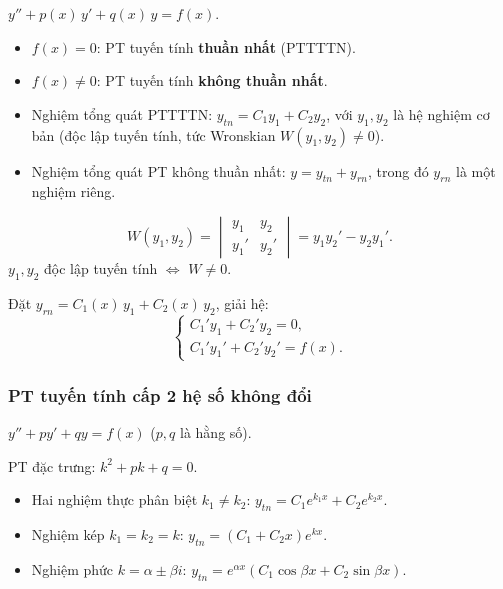 \documentclass[12pt,a4paper]{article}
\begin{document}
\begin{dinhnghia}
  $y'' + p(x)\,y' + q(x)\,y = f(x)$.
  \begin{itemize}
    \item $f(x) = 0$: PT tuyến tính \textbf{thuần nhất} (PTTTTN).
    \item $f(x) \ne 0$: PT tuyến tính \textbf{không thuần nhất}.
  \end{itemize}
\end{dinhnghia}

\begin{dinhly}[title={Cấu trúc nghiệm}]
  \begin{itemize}
    \item Nghiệm tổng quát PTTTTN: $y_{tn} = C_1 y_1 + C_2 y_2$, với $y_1, y_2$ là hệ nghiệm cơ bản (độc lập tuyến tính, tức Wronskian $W(y_1, y_2) \ne 0$).
    \item Nghiệm tổng quát PT không thuần nhất: $y = y_{tn} + y_{rn}$, trong đó $y_{rn}$ là một nghiệm riêng.
  \end{itemize}
\end{dinhly}

\begin{dinhnghia}[title={Wronskian}]
  \[
    W(y_1, y_2) = \begin{vmatrix} y_1 & y_2 \\ y_1' & y_2' \end{vmatrix} = y_1 y_2' - y_2 y_1'.
  \]
  $y_1, y_2$ độc lập tuyến tính $\Leftrightarrow$ $W \ne 0$.
\end{dinhnghia}

\begin{phuongphap}[title={Biến thiên hằng số (tìm nghiệm riêng)}]
  Đặt $y_{rn} = C_1(x)\,y_1 + C_2(x)\,y_2$, giải hệ:
  \[
    \begin{cases} C_1' y_1 + C_2' y_2 = 0, \\ C_1' y_1' + C_2' y_2' = f(x). \end{cases}
  \]
\end{phuongphap}

\subsubsection{PT tuyến tính cấp 2 hệ số không đổi}

\begin{dinhnghia}
  $y'' + py' + qy = f(x)$ \quad ($p, q$ là hằng số).
\end{dinhnghia}

\begin{congthuc}[title={Giải PT thuần nhất}]
  PT đặc trưng: $k^2 + pk + q = 0$.
  \begin{itemize}
    \item Hai nghiệm thực phân biệt $k_1 \ne k_2$: $y_{tn} = C_1 e^{k_1 x} + C_2 e^{k_2 x}$.
    \item Nghiệm kép $k_1 = k_2 = k$: $y_{tn} = (C_1 + C_2 x)e^{kx}$.
    \item Nghiệm phức $k = \alpha \pm \beta i$: $y_{tn} = e^{\alpha x}(C_1\cos\beta x + C_2\sin\beta x)$.
  \end{itemize}
\end{congthuc}
\end{document}
